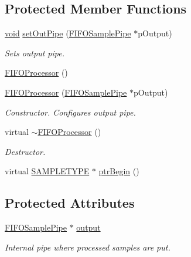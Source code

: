 \subsection*{Protected Member Functions}
\begin{DoxyCompactItemize}
\item 
\hyperlink{sound_8c_ae35f5844602719cf66324f4de2a658b3}{void} \hyperlink{classsoundtouch_1_1_f_i_f_o_processor_a877b96de2a52b13c2ea4a6a79c86d7c3}{set\+Out\+Pipe} (\hyperlink{classsoundtouch_1_1_f_i_f_o_sample_pipe}{F\+I\+F\+O\+Sample\+Pipe} $\ast$p\+Output)
\begin{DoxyCompactList}\small\item\em Sets output pipe. \end{DoxyCompactList}\item 
\hyperlink{classsoundtouch_1_1_f_i_f_o_processor_ac8d44cdb87a81c5540d80f52516046bf}{F\+I\+F\+O\+Processor} ()
\item 
\hyperlink{classsoundtouch_1_1_f_i_f_o_processor_a93abc6e7dc5f53031fa1142e5ee8df95}{F\+I\+F\+O\+Processor} (\hyperlink{classsoundtouch_1_1_f_i_f_o_sample_pipe}{F\+I\+F\+O\+Sample\+Pipe} $\ast$p\+Output)
\begin{DoxyCompactList}\small\item\em Constructor. Configures output pipe. \end{DoxyCompactList}\item 
virtual \hyperlink{classsoundtouch_1_1_f_i_f_o_processor_ae59b49f31bd5109452f4317fa6be9006}{$\sim$\+F\+I\+F\+O\+Processor} ()
\begin{DoxyCompactList}\small\item\em Destructor. \end{DoxyCompactList}\item 
virtual \hyperlink{namespacesoundtouch_a97cfd29a7abb4d4b2a72f803d5b5850c}{S\+A\+M\+P\+L\+E\+T\+Y\+PE} $\ast$ \hyperlink{classsoundtouch_1_1_f_i_f_o_processor_a7019f0e01fb5ed0ce530246e0c3961ec}{ptr\+Begin} ()
\end{DoxyCompactItemize}
\subsection*{Protected Attributes}
\begin{DoxyCompactItemize}
\item 
\hyperlink{classsoundtouch_1_1_f_i_f_o_sample_pipe}{F\+I\+F\+O\+Sample\+Pipe} $\ast$ \hyperlink{classsoundtouch_1_1_f_i_f_o_processor_a0e075a946ee53e7bd961fb2da884afad}{output}
\begin{DoxyCompactList}\small\item\em Internal pipe where processed samples are put. \end{DoxyCompactList}\end{DoxyCompactItemize}


